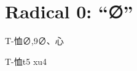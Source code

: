 
\section*{Radical 0: ``∅''}

\begin{Entry}{T-恤}{∅,9}{∅、⼼}
  \begin{Phonetics}{T-恤}{t5 xu4}
  \end{Phonetics}
\end{Entry}


